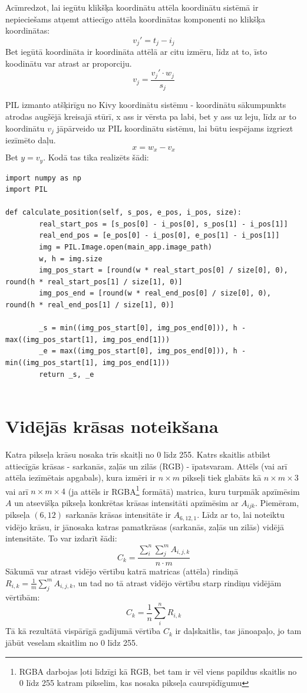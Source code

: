 \documentclass{article}
\begin{document}
Acīmredzot, lai iegūtu klikšķa koordinātu attēla koordinātu sistēmā ir nepieciešams atņemt attiecīgo attēla koordinātas komponenti no klikšķa koordinātas:
$$
    v_j\prime = t_j - i_j
$$
Bet iegūtā koordināta ir koordināta attēlā ar citu izmēru, līdz at to, īsto koodinātu var atrast ar proporciju.
$$
    v_j = \frac{v_j\prime \cdot w_j}{s_j}
$$

PIL izmanto atšķirīgu no Kivy koordinātu sistēmu - koordinātu sākumpunkts atrodas augšējā kreisajā stūrī, x ass ir vērsta pa labi, bet y ass uz leju, līdz ar to koordinātu $v_j$ jāpārveido uz PIL koordinātu sistēmu, lai būtu iespējams izgriezt iezīmēto daļu.
$$
    x = w_x - v_x
$$
Bet $y = v_y$. Kodā tas tika realizēts šādi:

\begin{lstlisting}
import numpy as np
import PIL

def calculate_position(self, s_pos, e_pos, i_pos, size):
        real_start_pos = [s_pos[0] - i_pos[0], s_pos[1] - i_pos[1]]
        real_end_pos = [e_pos[0] - i_pos[0], e_pos[1] - i_pos[1]]
        img = PIL.Image.open(main_app.image_path)
        w, h = img.size
        img_pos_start = [round(w * real_start_pos[0] / size[0], 0), round(h * real_start_pos[1] / size[1], 0)]
        img_pos_end = [round(w * real_end_pos[0] / size[0], 0), round(h * real_end_pos[1] / size[1], 0)]

        _s = min((img_pos_start[0], img_pos_end[0])), h - max((img_pos_start[1], img_pos_end[1]))
        _e = max((img_pos_start[0], img_pos_end[0])), h - min((img_pos_start[1], img_pos_end[1]))
        return _s, _e
    
\end{lstlisting}

\section{Vidējās krāsas noteikšana}

Katra pikseļa krāsu nosaka trīs skaitļi no 0 līdz 255. Katrs skaitlis atbilst attiecīgās krāsas - sarkanās, zaļās un zilās (RGB) - īpatsvaram. Attēls (vai arī attēla iezīmētais apgabals), kura izmēri ir $n\times m$ pikseļi tiek glabāts kā $n\times m \times 3$ vai arī $n \times m \times 4$ (ja attēls ir RGBA\footnote{RGBA darbojas ļoti līdzīgi kā RGB, bet tam ir vēl viens papildus skaitlis no 0 līdz 255 katram pikselim, kas nosaka pikseļa caurspīdīgumu} formātā) matrica, kuru turpmāk apzīmēsim $A$ un atsevišķa pikseļa konkrētas krāsas intensitāti apzīmēsim ar $A_{ijk}$. Piemēram, pikseļa $(6, 12)$ sarkanās krāsas intensitāte ir $A_{6,12,1}$. Līdz ar to, lai noteiktu vidējo krāsu, ir jānosaka katras pamatkrāsas (sarkanās, zaļās un zilās) vidējā intensitāte. To var izdarīt šādi:
$$
    C_{k} = \frac{\sum_i^n \sum_j^m A_{i,j,k}}{n\cdot m}
$$
Sākumā var atrast vidējo vērtību katrā matricas (attēla) rindiņā $ R_{i,k} = \frac{1}{m}\sum_j^m A_{i,j,k}$, un tad no tā atrast vidējo vērtību starp rindiņu vidējām vērtībām:
$$
    C_{k} = \frac{1}{n}\sum_i^n R_{i,k}
$$
Tā kā rezultātā vispārīgā gadījumā vērtība $C_{k}$ ir daļskaitlis, tas jānoapaļo, jo tam jābūt veselam skaitlim no 0 līdz 255.
\end{document}
